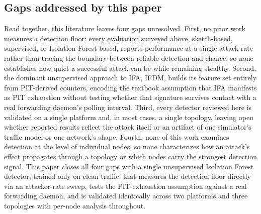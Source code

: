 \subsection{Gaps addressed by this paper}
Read together, this literature leaves four gaps unresolved. First, no prior work measures a detection floor: every evaluation surveyed above, sketch-based, supervised, or Isolation Forest-based, reports performance at a single attack rate rather than tracing the boundary between reliable detection and chance, so none establishes how quiet a successful attack can be while remaining stealthy. Second, the dominant unsupervised approach to IFA, IFDM, builds its feature set entirely from PIT-derived counters, encoding the textbook assumption that IFA manifests as PIT exhaustion without testing whether that signature survives contact with a real forwarding daemon's polling interval. Third, every detector reviewed here is validated on a single platform and, in most cases, a single topology, leaving open whether reported results reflect the attack itself or an artifact of one simulator's traffic model or one network's shape. Fourth, none of this work examines detection at the level of individual nodes, so none characterizes how an attack's effect propagates through a topology or which nodes carry the strongest detection signal. This paper closes all four gaps with a single unsupervised Isolation Forest detector, trained only on clean traffic, that measures the detection floor directly via an attacker-rate sweep, tests the PIT-exhaustion assumption against a real forwarding daemon, and is validated identically across two platforms and three topologies with per-node analysis throughout.
